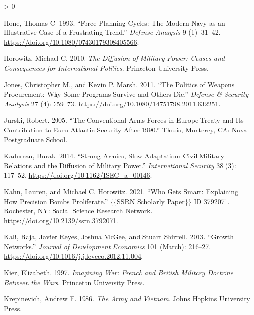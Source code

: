 \documentclass[
]{article}
\newlength{\cslhangindent}
\newenvironment{CSLReferences}[2] %
 {%
  \setlength{\parindent}{0pt}
  \ifodd #1 \everypar{\setlength{\hangindent}{\cslhangindent}}\ignorespaces\fi
  \ifnum #2 > 0
  \setlength{\parskip}{#2\baselineskip}
  \fi
 }%
 {}
\begin{document}
\begin{CSLReferences}{1}{0}
\leavevmode\hypertarget{ref-hone_forceplanningcycles_1993}{}%
Hone, Thomas C. 1993. {``Force Planning Cycles: {The} Modern Navy as an Illustrative Case of a Frustrating Trend.''} \emph{Defense Analysis} 9 (1): 31--42. \url{https://doi.org/10.1080/07430179308405566}.

\leavevmode\hypertarget{ref-horowitz_diffusionmilitarypower_2010}{}%
Horowitz, Michael C. 2010. \emph{The {Diffusion} of {Military Power}: {Causes} and {Consequences} for {International Politics}}. {Princeton University Press}.

\leavevmode\hypertarget{ref-jones_politicsweaponsprocurement_2011}{}%
Jones, Christopher M., and Kevin P. Marsh. 2011. {``The {Politics} of {Weapons Procurement}: {Why Some Programs Survive} and {Others Die}.''} \emph{Defense \& Security Analysis} 27 (4): 359--73. \url{https://doi.org/10.1080/14751798.2011.632251}.

\leavevmode\hypertarget{ref-jurski_conventionalarmsforces_2005}{}%
Jurski, Robert. 2005. {``The {Conventional Arms Forces} in {Europe Treaty} and {Its Contribution} to {Euro}-{Atlantic Security After} 1990.''} Thesis, {Monterey, CA}: Naval Postgraduate School.

\leavevmode\hypertarget{ref-kadercan_strongarmiesslow_2014}{}%
Kadercan, Burak. 2014. {``Strong {Armies}, {Slow Adaptation}: {Civil}-{Military Relations} and the {Diffusion} of {Military Power}.''} \emph{International Security} 38 (3): 117--52. \url{https://doi.org/10.1162/ISEC_a_00146}.

\leavevmode\hypertarget{ref-kahn_whogetssmart_2021}{}%
Kahn, Lauren, and Michael C. Horowitz. 2021. {``Who {Gets Smart}: {Explaining How Precision Bombs Proliferate}.''} \{\{SSRN Scholarly Paper\}\} ID 3792071. {Rochester, NY}: {Social Science Research Network}. \url{https://doi.org/10.2139/ssrn.3792071}.

\leavevmode\hypertarget{ref-kali_growthnetworks_2013}{}%
Kali, Raja, Javier Reyes, Joshua McGee, and Stuart Shirrell. 2013. {``Growth Networks.''} \emph{Journal of Development Economics} 101 (March): 216--27. \url{https://doi.org/10.1016/j.jdeveco.2012.11.004}.

\leavevmode\hypertarget{ref-kier_imaginingwarfrench_1997}{}%
Kier, Elizabeth. 1997. \emph{Imagining {War}: {French} and {British Military Doctrine} Between the {Wars}}. {Princeton University Press}.

\leavevmode\hypertarget{ref-krepinevich_armyvietnam_1986}{}%
Krepinevich, Andrew F. 1986. \emph{The Army and {Vietnam}}. {Johns Hopkins University Press}.


\end{CSLReferences}
\end{document}
